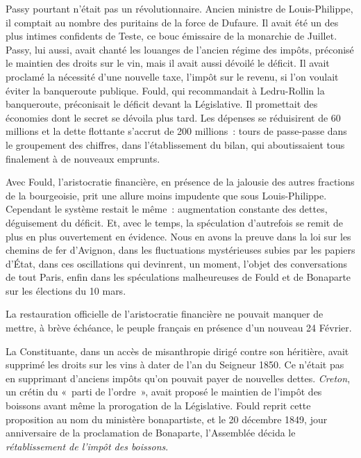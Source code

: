 \documentclass[twoside]{book} %
\begin{document}
Passy pourtant n’était pas un révolutionnaire. Ancien ministre de Louis-Philippe, il comptait au nombre des puritains de la force de Dufaure. Il avait été un des plus intimes confidents de Teste, ce bouc émissaire de la monarchie de Juillet. Passy, lui aussi, avait chanté les louanges de l’ancien régime des impôts, préconisé le maintien des droits sur le vin, mais il avait aussi dévoilé le déficit. Il avait proclamé la nécessité d’une nouvelle taxe, l’impôt sur le revenu, si l’on voulait éviter la banqueroute publique. Fould, qui recommandait à Ledru-Rollin la banqueroute, préconisait le déficit devant la Législative. Il promettait des économies dont le secret se dévoila plus tard. Les dépenses se réduisirent de 60 millions et la dette flottante s’accrut de 200 millions : tours de passe-passe dans le groupement des chiffres, dans l’établissement du bilan, qui aboutissaient tous finalement à de nouveaux emprunts.\par
Avec Fould, l’aristocratie financière, en présence de la jalousie des autres fractions de la bourgeoisie, prit une allure moins impudente que sous Louis-Philippe. Cependant le système restait le même : augmentation constante des dettes, déguisement du déficit. Et, avec le temps, la spéculation d’autrefois se remit de plus en plus ouvertement en évidence. Nous en avons la preuve dans la loi sur les chemins de fer d’Avignon, dans les fluctuations mystérieuses subies par les papiers d’État, dans ces oscillations qui devinrent, un moment, l’objet des conversations de tout Paris, enfin dans les spéculations malheureuses de Fould et de Bonaparte sur les élections du 10 mars.\par
La restauration officielle de l’aristocratie financière ne pouvait manquer de mettre, à brève échéance, le peuple français en présence d’un nouveau 24 Février.\par
La Constituante, dans un accès de misanthropie dirigé contre son héritière, avait supprimé les droits sur les vins à dater de l’an du Seigneur 1850. Ce n’était pas en supprimant d’anciens impôts qu’on pouvait payer de nouvelles dettes. \emph{Creton}, un crétin du « parti de l’ordre », avait proposé le maintien de l’impôt des boissons avant même la prorogation de la Législative. Fould reprit cette proposition au nom du ministère bonapartiste, et le 20 décembre 1849, jour anniversaire de la proclamation de Bonaparte, l’Assemblée décida le \emph{rétablissement de l’impôt des boissons}.\par
\end{document}
